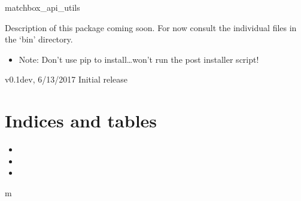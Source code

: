 \documentclass[letterpaper,10pt,english]{sphinxmanual}
\begin{document}
matchbox\_api\_utils

Description of this package coming soon.  For now consult the individual files in the ‘bin’ directory.
\begin{itemize}
\item {} 
Note: Don’t use pip to install…won’t run the post installer script!

\end{itemize}

v0.1dev, 6/13/2017 \textendash{} Initial release


\chapter{Indices and tables}
\label{\detokenize{index:indices-and-tables}}\label{\detokenize{index::doc}}\begin{itemize}
\item {} 

\item {} 

\item {} 

\end{itemize}


\renewcommand{\indexname}{Python Module Index}
\begin{sphinxtheindex}
\def\bigletter#1{{\Large\sffamily#1}\nopagebreak\vspace{1mm}}
\bigletter{m}
\item {}
\item {}
\item {}
\end{sphinxtheindex}

\renewcommand{\indexname}{Index}
\printindex
\end{document}
